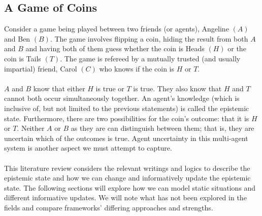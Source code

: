 \documentclass[12pt, a4paper, titlepage]{scrartcl}
\begin{document}
\subsection{A Game of Coins}\label{intro_coinFlipping}
Consider a game being played between two friends (or agents), Angeline $(A)$
and Ben $(B)$.
The game involves flipping a coin, hiding the result from both $A$ and $B$ and
having both of them guess whether the coin is Heads $(H)$ or the coin is Tails
$(T)$.
The game is refereed by a mutually trusted (and usually impartial) friend, Carol
$(C)$ who knows if the coin is $H$ or $T$.\\
\\
$A$ and $B$ know that either $H$ is true or $T$ is true.
They also know that $H$ and $T$ cannot both occur simultaneously together.
An agent's knowledge (which is inclusive of, but not limited to the previous
statements) is called the epistemic state.
Furthermore, there are two possibilities for the coin's outcome: that it is $H$
or $T$.
Neither $A$ or $B$ as they are can distinguish between them; that is, they are
uncertain which of the outcomes is true.
Agent uncertainty in this multi-agent system is another aspect we must attempt
to capture.\\
\\
This literature review considers the relevant writings and logics to describe
the epistemic state and how we can change and informatively update the epistemic
state.
The following sections will explore how we can model static situations and
different informative updates.
We will note what has not been explored in the fields and compare frameworks'
differing approaches and strengths.
\end{document}
